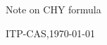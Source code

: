 \documentclass[11pt]{article}
\begin{document}
\begin{center}
    {\LARGE \sf Note on CHY formula}

    \vspace{1.5em}

    {\large ITP-CAS,\quad \today}

    \vspace{2em}
\end{center}


\end{document}
